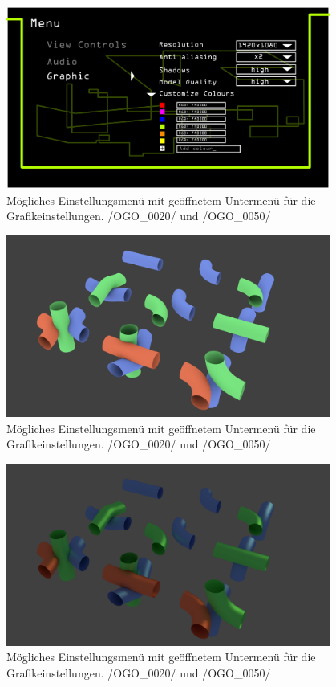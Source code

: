 	\begin{figure}[ht]
	  \centering
	  \includegraphics[width = 0.95\textwidth]{Inhalt/Nutzung/Grafiken/Grafische_Oberflaechen/08_Knot3-menu-graphics.png}
	  \caption{Mögliches Einstellungsmenü mit geöffnetem Untermenü für die Grafikeinstellungen. /OGO\_0020/ und /OGO\_0050/}
	\end{figure}
	
	\begin{figure}[ht]
	  \centering
	  \includegraphics[width = 0.95\textwidth]{Inhalt/Nutzung/Grafiken/Grafische_Oberflaechen/Pipes1.png}
	  \caption{Mögliches Einstellungsmenü mit geöffnetem Untermenü für die Grafikeinstellungen. /OGO\_0020/ und /OGO\_0050/}
	\end{figure}
	
\begin{figure}[ht]
	  \centering
	  \includegraphics[width = 0.95\textwidth]{Inhalt/Nutzung/Grafiken/Grafische_Oberflaechen/Pipes2.png}
	  \caption{Mögliches Einstellungsmenü mit geöffnetem Untermenü für die Grafikeinstellungen. /OGO\_0020/ und /OGO\_0050/}
	\end{figure}
	
	

